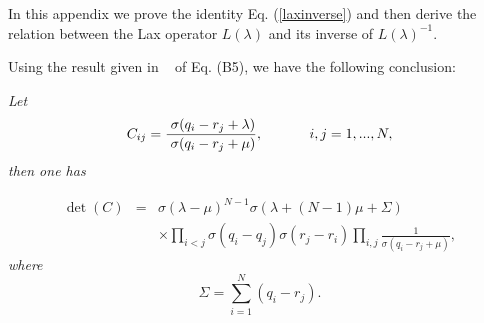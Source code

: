 \documentclass[a4paper,12pt]{article}
\renewcommand{\theequation}{\thesection.\arabic{equation}}
\begin{document}
\renewcommand{\theequation}{A.\arabic{equation}}
\setcounter{equation}{0} In
this appendix we prove the identity Eq. (\ref{laxinverse})
and then derive the relation between the Lax operator
$L(\lambda )$ and its inverse of $L(\lambda )^{-1}$.

Using the result given in \ \cite{r1} of Eq. (B5), we have
the following conclusion:

\noindent \textit{Let}
\begin{equation}
C_{ij}=\frac{\;\sigma (q_{i}-r_{j}+\lambda )}{\;\sigma
(q_{i}-r_{j}+\mu )},
\mbox{$ \ \ \ \ \ \ \ \ \ \ $}i,j=1,...,N,
\end{equation}
\textit{then one has }

\begin{eqnarray}
\det (C) &=&\sigma (\lambda -\mu )^{N-1}\sigma (\lambda +(N-1)\mu +\Sigma )
\nonumber \\
&&\times \prod_{i<j}\sigma (q_{i}-q_{j})\sigma
(r_{j}-r_{i})\prod_{i,j}\frac{ 1}{\sigma (q_{i}-r_{j}+\mu
)},  \label{A1}
\end{eqnarray}
\textit{where}
\begin{equation}
\Sigma =\sum_{i=1}^{N}(q_{i}-r_{j}).
\end{equation}
\end{document}
